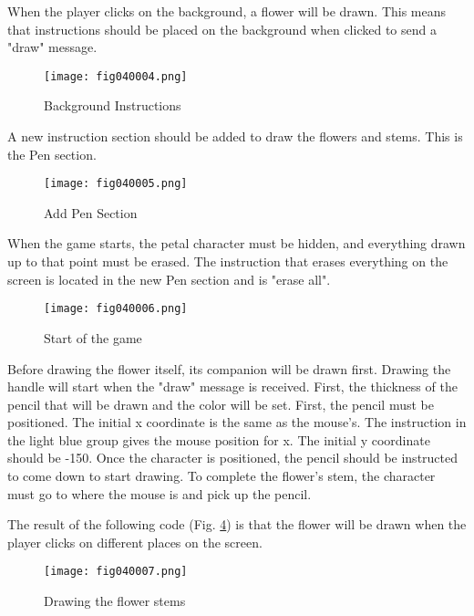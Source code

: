 When the player clicks on the background, a flower will be drawn. This means that instructions should be placed on the background when clicked to send a "draw" message.

\begin{figure}[H]
   \centering
   \texttt{[image: fig040004.png]}
   \caption{Background Instructions}
\label{fig040004}
\end{figure}

A new instruction section should be added to draw the flowers and stems. This is the Pen section.

\begin{figure}[H]
   \centering
   \texttt{[image: fig040005.png]}
   \caption{Add Pen Section}
\label{fig040005}
\end{figure}

When the game starts, the petal character must be hidden, and everything drawn up to that point must be erased. The instruction that erases everything on the screen is located in the new Pen section and is "erase all".

\begin{figure}[H]
   \centering
   \texttt{[image: fig040006.png]}
   \caption{Start of the game}
\label{fig040006}
\end{figure}

Before drawing the flower itself, its companion will be drawn first. Drawing the handle will start when the "draw" message is received. First, the thickness of the pencil that will be drawn and the color will be set. First, the pencil must be positioned. The initial x coordinate is the same as the mouse's. The instruction in the light blue group gives the mouse position for x. The initial y coordinate should be -150. Once the character is positioned, the pencil should be instructed to come down to start drawing. To complete the flower's stem, the character must go to where the mouse is and pick up the pencil.

The result of the following code (Fig. \ref{fig040007}) is that the flower will be drawn when the player clicks on different places on the screen.

\begin{figure}[H]
   \centering
   \texttt{[image: fig040007.png]}
   \caption{Drawing the flower stems}
\label{fig040007}
\end{figure}

